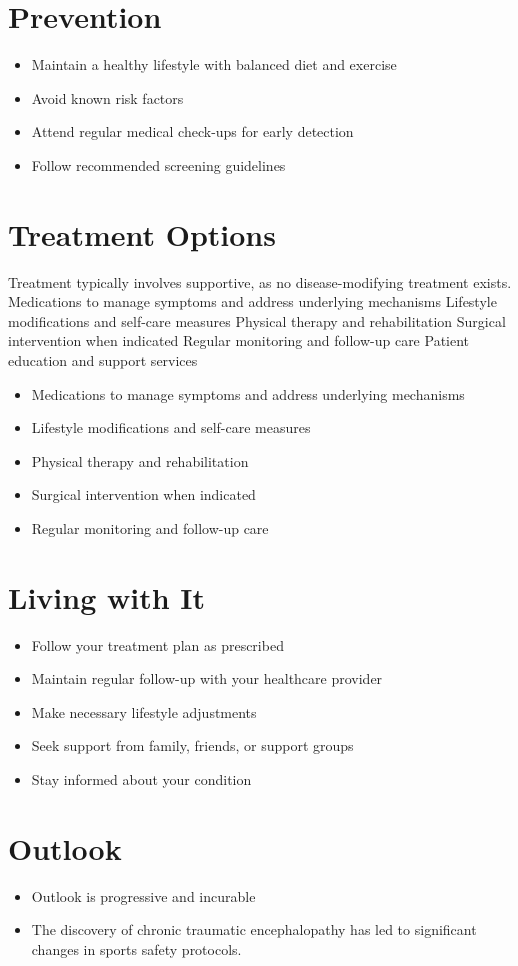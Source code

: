 \section{Prevention}
\begin{itemize}[noitemsep]
  \item Maintain a healthy lifestyle with balanced diet and exercise
  \item Avoid known risk factors
  \item Attend regular medical check-ups for early detection
  \item Follow recommended screening guidelines
\end{itemize}
\section{Treatment Options}
Treatment typically involves supportive, as no disease-modifying treatment exists. Medications to manage symptoms and address underlying mechanisms Lifestyle modifications and self-care measures Physical therapy and rehabilitation Surgical intervention when indicated Regular monitoring and follow-up care Patient education and support services

\begin{itemize}[noitemsep]
  \item Medications to manage symptoms and address underlying mechanisms
  \item Lifestyle modifications and self-care measures
  \item Physical therapy and rehabilitation
  \item Surgical intervention when indicated
  \item Regular monitoring and follow-up care
\end{itemize}
\section{Living with It}
\begin{itemize}[noitemsep]
  \item Follow your treatment plan as prescribed
  \item Maintain regular follow-up with your healthcare provider
  \item Make necessary lifestyle adjustments
  \item Seek support from family, friends, or support groups
  \item Stay informed about your condition
\end{itemize}
\section{Outlook}
\begin{itemize}[noitemsep]
  \item Outlook is progressive and incurable
  \item The discovery of chronic traumatic encephalopathy has led to significant changes in sports safety protocols.
\end{itemize}
